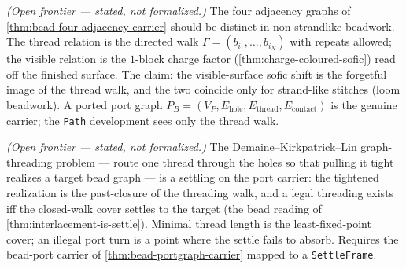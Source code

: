 \begin{theorem}\label{thm:bead-thread-walk-distinct}\notready{}
\emph{(Open frontier --- stated, not formalized.)} The four adjacency graphs of
\cref{thm:bead-four-adjacency-carrier} should be distinct in non-strandlike
beadwork.  The thread
relation is the directed walk $\Gamma=(b_{i_1},\dots,b_{i_N})$ with repeats allowed; the
visible relation is the $1$-block charge factor (\cref{thm:charge-coloured-sofic}) read off
the finished surface. The claim: the visible-surface sofic shift is the forgetful image of
the thread walk, and the two coincide only for strand-like stitches (loom beadwork). A
ported port graph $P_B=(V_P,E_{\text{hole}},E_{\text{thread}},E_{\text{contact}})$ is the
genuine carrier; the \texttt{Path} development sees only the thread walk.
\end{theorem}

\begin{theorem}\label{thm:bead-threading-closed-walk}\notready{}
\emph{(Open frontier --- stated, not formalized.)} The Demaine--Kirkpatrick--Lin
graph-threading problem --- route one thread through the holes so that pulling it tight
realizes a target bead graph --- is a settling on the port carrier: the tightened
realization is the past-closure of the threading walk, and a legal threading exists iff the
closed-walk cover settles to the target (the bead reading of
\cref{thm:interlacement-is-settle}). Minimal thread length is the least-fixed-point cover;
an illegal port turn is a point where the settle fails to absorb. Requires the bead-port
carrier of \cref{thm:bead-portgraph-carrier} mapped to a \texttt{SettleFrame}.
\end{theorem}
